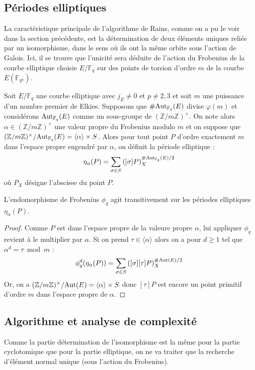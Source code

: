 \documentclass[a4paper]{article} %
\numberwithin{section}{part}
\numberwithin{equation}{section}
\newcommand\zmodninv[1]{(\mathbb{Z}/#1\mathbb{Z})^{\times}}
\newcommand\GF[1]{\mathbb{F}_{#1}}
\newcommand\groupgen[1]{\langle{#1}\rangle}
\begin{document}
\subsection{Périodes elliptiques}
\label{sec:perell}
La caractéristique principale de l'algorithme de Rains, comme on a pu le voir
dans la section précédente, est la détermination de deux éléments uniques reliés
par un isomorphisme, dans le sens où ils ont la même orbite sous l'action de
Galois. Ici, il se trouve que l'unicité sera déduite de
l'action du Frobenius de la courbe elliptique choisie $E/\GF{q}$ sur des points
de torsion d'ordre $m$ de la courbe $E(\GF{q^n})$.
\begin{defn}
Soit $E/\GF{q}$ une courbe elliptique avec $j_E\neq0$ et $p\neq2, 3$ et soit $m$
une puissance d'un nombre premier de Elkies. Supposons que
$\#\textup{Aut}_{\GF{q}}(E)$ divise $\varphi(m)$ et considérons
$\textup{Aut}_{\GF{q}}(E)$ comme un sous-groupe de $\zmodninv{m}$. On note alors
$\alpha\in\zmodninv{m}$ une valeur propre du Frobenius modulo $m$ et on suppose
que $\zmodninv{m}/\textup{Aut}_{\GF{q}}(E) = \groupgen{\alpha}\times S$. Alors
pour tout point $P$ d'ordre exactement $m$ dans l'espace propre engendré par
$\alpha$, on définit la période elliptique :
\begin{equation}
\eta_{\alpha}(P) = \sum_{\sigma\in S}
{\left([\sigma]P\right)_X^{\#\textup{Aut}_{\GF{q}}(E)/2}}
\end{equation}
où $P_X$ désigne l'abscisse du point $P$.
\end{defn}
\begin{prop}
L'endomorphisme de Frobenius $\phi_q$ agit transitivement sur les périodes 
elliptiques $\eta_{\alpha}(P)$.
\end{prop}
\begin{proof}
Comme $P$ est dans l'espace propre de la valeure propre $\alpha$, lui appliquer 
$\phi_q$ revient à le multiplier par $\alpha$. Si on prend 
$\tau\in\groupgen{\alpha}$ alors on a pour $d\geq1$ tel que $\alpha^d = \tau 
\bmod m$ :
\begin{equation}
\phi_q^d(\eta_{\alpha}(P)) = \sum_{\sigma\in
S}{\left([\sigma][\tau]P\right)_X^{\#\textup{Aut}(E)/2}}
\end{equation}
Or, on a $\zmodninv{m}/\textup{Aut}(E) = \groupgen{\alpha} \times S$ donc
$[\tau]P$ est encore un point primitif d'ordre $m$ dans l'espace propre de 
$\alpha$.
\end{proof}
\subsection{Algorithme et analyse de complexité}
\label{sec:algcompell}
Comme la partie détermination de l'isomorphisme est la même pour la partie
cyclotomique que pour la partie elliptique, on ne va traiter que la recherche
d'élément normal unique (sous l'action du Frobenius).\par
\end{document}
